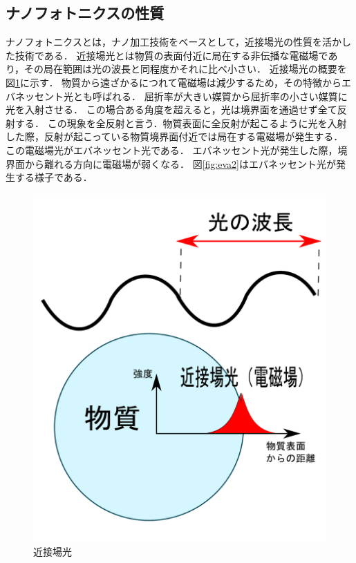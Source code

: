 \subsection{ナノフォトニクスの性質}
ナノフォトニクスとは，ナノ加工技術をベースとして，近接場光の性質を活かした技術である．
近接場光とは物質の表面付近に局在する非伝播な電磁場であり，その局在範囲は光の波長と同程度かそれに比べ小さい．
近接場光の概要を図\ref{fig:kinsetu}に示す．
物質から遠ざかるにつれて電磁場は減少するため，その特徴からエバネッセント光とも呼ばれる．
屈折率が大きい媒質から屈折率の小さい媒質に光を入射させる．
この場合ある角度を超えると，光は境界面を通過せず全て反射する．
この現象を全反射と言う．物質表面に全反射が起こるように光を入射した際，反射が起こっている物質境界面付近では局在する電磁場が発生する．
この電磁場光がエバネッセント光である．
エバネッセント光が発生した際，境界面から離れる方向に電磁場が弱くなる．
図\ref{fig:eva2}はエバネッセント光が発生する様子である．
\begin{figure}[t!]
\begin{center}
\includegraphics[keepaspectratio,scale=0.3]{fig/3/kinsetu.pdf}
\caption{近接場光}
\label{fig:kinsetu}
\end{center}
\end{figure}
